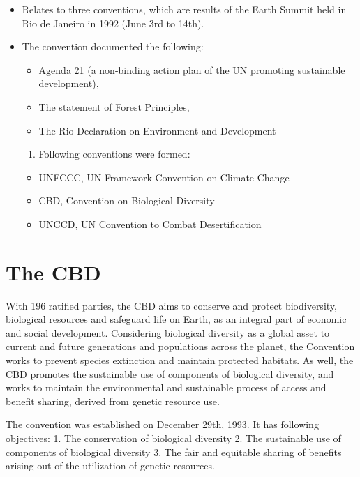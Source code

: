 \documentclass[
]{book}
\providecommand{\tightlist}{%
  \setlength{\itemsep}{0pt}\setlength{\parskip}{0pt}}
\begin{document}
\begin{itemize}
\tightlist
\item
  Relates to three conventions, which are results of the Earth Summit held in Rio de Janeiro in 1992 (June 3rd to 14th).
\item
  The convention documented the following:

  \begin{itemize}
  \tightlist
  \item
    Agenda 21 (a non-binding action plan of the UN promoting sustainable development),
  \item
    The statement of Forest Principles,
  \item
    The Rio Declaration on Environment and Development
  \end{itemize}

  \begin{enumerate}
  \def\labelenumi{\arabic{enumi}.}
  \setcounter{enumi}{61}
  \tightlist
  \item
    Following conventions were formed:
  \end{enumerate}

  \begin{itemize}
  \tightlist
  \item
    UNFCCC, UN Framework Convention on Climate Change
  \item
    CBD, Convention on Biological Diversity
  \item
    UNCCD, UN Convention to Combat Desertification
  \end{itemize}
\end{itemize}

\hypertarget{the-cbd}{%
\section{The CBD}\label{the-cbd}}

With 196 ratified parties, the CBD aims to conserve and protect biodiversity, biological resources and safeguard life on Earth, as an integral part of economic and social development. Considering biological diversity as a global asset to current and future generations and populations across the planet, the Convention works to prevent species extinction and maintain protected habitats. As well, the CBD promotes the sustainable use of components of biological diversity, and works to maintain the environmental and sustainable process of access and benefit sharing, derived from genetic resource use.

The convention was established on December 29th, 1993. It has following objectives:
1. The conservation of biological diversity
2. The sustainable use of components of biological diversity
3. The fair and equitable sharing of benefits arising out of the utilization of genetic resources.
\end{document}
